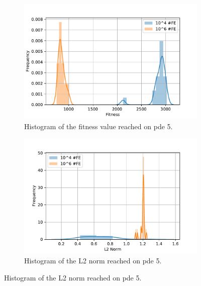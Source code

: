 \documentclass[./\jobname.tex]{subfiles}
\begin{document}
\begin{figure}[H]
	\centering
	\begin{subfigure}[b]{0.5\linewidth}
		\centering
		\includegraphics[width=1\textwidth]{../../code/experiments/experiment_0/pde5_fit_histogram.pdf}
		\caption{Histogram of the fitness value reached on \gls{pde} 5.}
		\label{fig:pde5_fitness_histogram}
	\end{subfigure}%
	\begin{subfigure}[b]{0.5\linewidth}
		\centering
		\includegraphics[width=1\textwidth]{../../code/experiments/experiment_0/pde5_norm_histogram.pdf}
		\caption{Histogram of the L2 norm reached on \gls{pde} 5.}
		\label{fig:pde5_norm_histogram}
	\end{subfigure}%
	\label{fig:pde5_histograms}
\end{figure}
\end{document}

